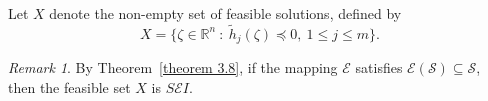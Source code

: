 \documentclass[12pt, reqno]{amsart}
\newtheorem{lemma}{Lemma}[section]
\theoremstyle{definition}
\theoremstyle{remark}
\newtheorem{remark}{Remark}[section]
\numberwithin{equation}{section}
\begin{document}
        \noindent    
      Let ${X}$ denote the non-empty set of feasible solutions, defined by  
       \begin{equation}\label{4.2} 
          {X}=\big\{\mathit{\zeta} \in\mathbb{R}^{n}~:~\tilde{h}_{j}(\mathit{\zeta} )\preceq 0,~1\leq j\leq m\big\}.
       \end{equation} 

\begin{remark}
   By Theorem~\ref{theorem 3.8}, if the mapping $\mathcal{E}$ satisfies $\mathcal{E}(\mathcal{S}) \subseteq \mathcal{S}$, then the feasible set $X$ is $S\mathcal{E}I$.
\end{remark}




\end{document}
